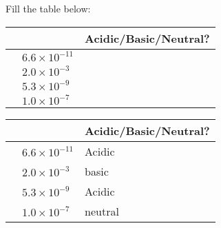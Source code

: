 \documentclass[main.tex]{subfiles}
\begin{document}
\begin{multicols*}{2}
\begin{question}[ID=\the\value{numA}]
Fill the table below:
\begin{center}\begin{tabularx}{0.9\columnwidth}{>{ \arraybackslash}p{5em}>{ \arraybackslash}p{5em}>{\centering\arraybackslash}p{2em}   }
  \toprule
\heading{$\big[ \ce{H^+} \big]$} & \heading{$\big[ \ce{OH^-} \big]$}  &  Acidic/Basic/Neutral?      \\
    \midrule
 { \small $1.5\times 10^{-4}$}	&   { \small $6.6\times 10^{-11}$}		&	 	       \\
 { \small $4.9\times 10^{-12}$}	&   { \small $2.0\times 10^{-3}$}		&	 	       \\
 { \small $1.9\times 10^{-6}$}	&   { \small $5.3\times 10^{-9}$}		&	 	       \\
 { \small $1.0\times 10^{-7}$}	&   { \small $1.0\times 10^{-7}$}		&	 	       \\
    \bottomrule
\end{tabularx}\end{center}
\end{question}
\begin{solution}
\begin{center}\begin{tabularx}{0.9\columnwidth}{>{ \arraybackslash}p{5em}>{ \arraybackslash}p{5em}>{\centering\arraybackslash}p{2em}   }
  \toprule
\heading{$\big[ \ce{H^+} \big]$} & \heading{$\big[ \ce{OH^-} \big]$}  &  Acidic/Basic/Neutral?      \\
    \midrule
 { \small $1.5\times 10^{-4}$}	&   { \small $6.6\times 10^{-11}$}		&Acidic	 	       \\
 { \small $4.9\times 10^{-12}$}	&   { \small $2.0\times 10^{-3}$}		&	 basic	       \\
 { \small $1.9\times 10^{-6}$}	&   { \small $5.3\times 10^{-9}$}		&	Acidic 	       \\
 { \small $1.0\times 10^{-7}$}	&   { \small $1.0\times 10^{-7}$}		&	 neutral	       \\
	    \bottomrule
\end{tabularx}\end{center}
\hspace{0.1cm}\end{solution}%




\end{multicols*}
\end{document}
